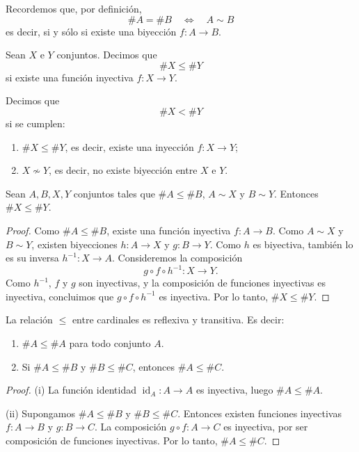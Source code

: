 Recordemos que, por definición,
\[
\#A = \#B \quad \Longleftrightarrow \quad A \sim B
\]
es decir, si y sólo si existe una biyección \(f : A \to B\).

\begin{defi}
Sean $X$ e $Y$ conjuntos. Decimos que
\[
\#X \le \#Y
\]
si existe una función inyectiva \(f : X \to Y\).
\end{defi}

\begin{defi}
Decimos que
\[
\#X < \#Y
\]
si se cumplen:
\begin{enumerate}[label=(\roman*)]
    \item \(\#X \le \#Y\), es decir, existe una inyección \(f : X \to Y\);
    \item \(X \not\sim Y\), es decir, no existe biyección entre \(X\) e \(Y\).
\end{enumerate}
\end{defi}

\begin{prop}
Sean $A, B, X, Y$ conjuntos tales que $\#A \le \#B$, $A \sim X$ y $B \sim Y$.
Entonces $\#X \le \#Y$.
\end{prop}

\begin{proof}
Como $\#A \le \#B$, existe una función inyectiva $f : A \to B$. Como $A \sim X$
y $B \sim Y$, existen biyecciones $h : A \to X$ y $g : B \to Y$. Como $h$ es
biyectiva, también lo es su inversa $h^{-1} : X \to A$. Consideremos la
composición
\[
g \circ f \circ h^{-1} : X \to Y.
\]
Como $h^{-1}$, $f$ y $g$ son inyectivas, y la composición de funciones
inyectivas es inyectiva, concluimos que $g \circ f \circ h^{-1}$ es inyectiva.
Por lo tanto, $\#X \le \#Y$.
\end{proof}

\begin{prop}
La relación $\le$ entre cardinales es reflexiva y transitiva. Es decir:
\begin{enumerate}[label=(\roman*)]
\item $\#A \le \#A$ para todo conjunto $A$.
\item Si $\#A \le \#B$ y $\#B \le \#C$, entonces $\#A \le \#C$.
\end{enumerate}
\end{prop}

\begin{proof}
(i) La función identidad $\operatorname{id}_A : A \to A$ es inyectiva, luego
$\#A \le \#A$.

(ii) Supongamos $\#A \le \#B$ y $\#B \le \#C$. Entonces existen funciones
inyectivas $f : A \to B$ y $g : B \to C$. La composición $g \circ f : A \to C$
es inyectiva, por ser composición de funciones inyectivas. Por lo tanto,
$\#A \le \#C$.
\end{proof}

